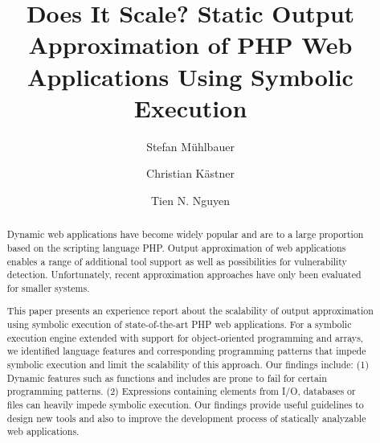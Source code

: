\documentclass[sigconf]{acmart}
\begin{document}
\title{Does It Scale? Static Output Approximation of PHP Web Applications Using
Symbolic Execution}


\author{Stefan Mühlbauer}

\author{Christian Kästner}

\author{Tien N. Nguyen}


\renewcommand{\shortauthors}{\textcolor{blue}{put shortauthors here}}


\begin{abstract}
Dynamic web applications have become widely popular and are to
a large proportion based on the scripting language PHP. Output approximation of web
applications enables a range of additional tool support as well as possibilities
for vulnerability detection. Unfortunately, recent approximation approaches have
only been evaluated for smaller systems.

This paper presents an experience report about the scalability of output
approximation using symbolic execution of state-of-the-art PHP web
applications. For a symbolic execution engine extended with support for
object-oriented programming and arrays, we identified language features and
corresponding programming patterns that impede symbolic execution and limit the
scalability of this approach. Our findings include: (1) Dynamic features such as
functions and includes are prone to fail for certain programming patterns. (2)
Expressions containing elements from I/O, databases or files can heavily impede
symbolic execution. Our findings provide useful guidelines to design new
tools and also to improve the development process of statically analyzable web
applications.
\end{abstract}
\end{document}
